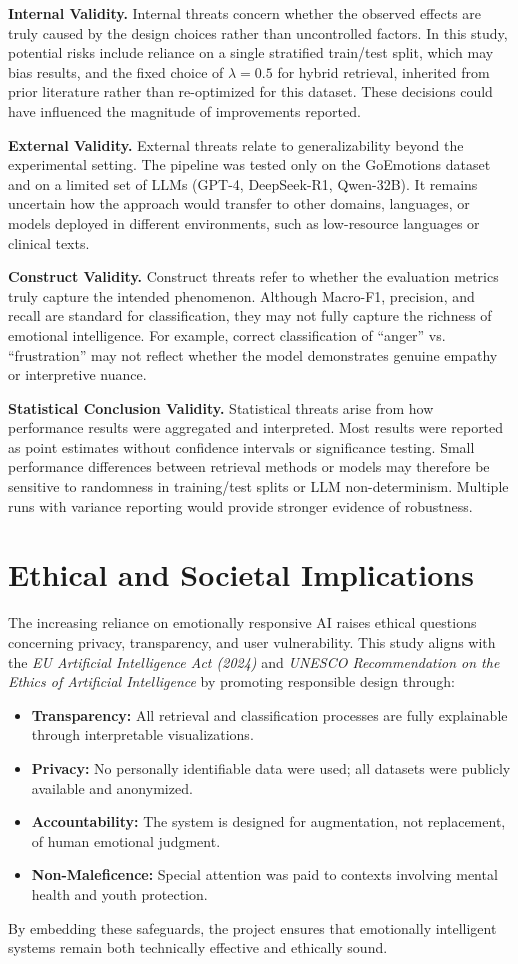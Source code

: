 \textbf{Internal Validity.} Internal threats concern whether the observed effects are truly caused by the design choices rather than uncontrolled factors. In this study, potential risks include reliance on a single stratified train/test split, which may bias results, and the fixed choice of $\lambda=0.5$ for hybrid retrieval, inherited from prior literature rather than re-optimized for this dataset. These decisions could have influenced the magnitude of improvements reported.

\textbf{External Validity.} External threats relate to generalizability beyond the experimental setting. The pipeline was tested only on the GoEmotions dataset and on a limited set of LLMs (GPT-4, DeepSeek-R1, Qwen-32B). It remains uncertain how the approach would transfer to other domains, languages, or models deployed in different environments, such as low-resource languages or clinical texts.

\textbf{Construct Validity.} Construct threats refer to whether the evaluation metrics truly capture the intended phenomenon. Although Macro-F1, precision, and recall are standard for classification, they may not fully capture the richness of emotional intelligence. For example, correct classification of “anger” vs. “frustration” may not reflect whether the model demonstrates genuine empathy or interpretive nuance.

\textbf{Statistical Conclusion Validity.} Statistical threats arise from how performance results were aggregated and interpreted. Most results were reported as point estimates without confidence intervals or significance testing. Small performance differences between retrieval methods or models may therefore be sensitive to randomness in training/test splits or LLM non-determinism. Multiple runs with variance reporting would provide stronger evidence of robustness.
\section{Ethical and Societal Implications}

The increasing reliance on emotionally responsive AI raises ethical questions concerning privacy, transparency, and user vulnerability. 
This study aligns with the \textit{EU Artificial Intelligence Act (2024)} and \textit{UNESCO Recommendation on the Ethics of Artificial Intelligence} by promoting responsible design through:

\begin{itemize}
    \item \textbf{Transparency:} All retrieval and classification processes are fully explainable through interpretable visualizations.
    \item \textbf{Privacy:} No personally identifiable data were used; all datasets were publicly available and anonymized.
    \item \textbf{Accountability:} The system is designed for augmentation, not replacement, of human emotional judgment.
    \item \textbf{Non-Maleficence:} Special attention was paid to contexts involving mental health and youth protection.
\end{itemize}

By embedding these safeguards, the project ensures that emotionally intelligent systems remain both technically effective and ethically sound.
